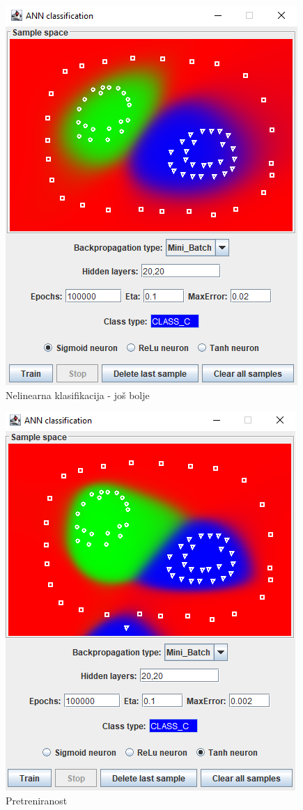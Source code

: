 \documentclass[times, utf8, zavrsni]{fer}
\begin{document}
\begin{figure}[H]
    \centering
    \includegraphics[scale=0.6]{img/sigmoid-almost-best.png}
    \caption[Caption for LOF]{Nelinearna klasifikacija - još bolje}
    \label{fig:sigmoid-almost-best}
\end{figure}

\begin{figure}[H]
    \centering
    \includegraphics[scale=0.6]{img/overfitting.png}
    \caption[Caption for LOF]{Pretreniranost}
    \label{fig:overfitting}
\end{figure}
\end{document}
